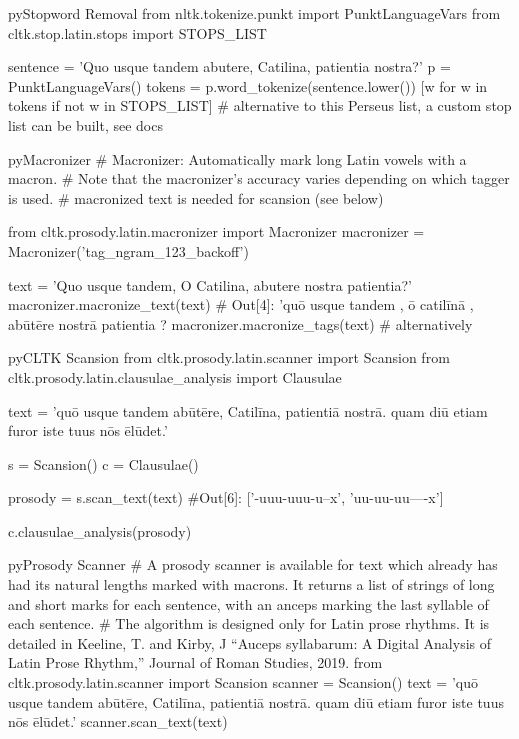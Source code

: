 \documentclass[10pt,a4paper]{article}
\begin{document}
\begin{multicols}{3}
\begin{codebox}{py}{Stopword Removal}
from nltk.tokenize.punkt import PunktLanguageVars
from cltk.stop.latin.stops import STOPS_LIST

sentence = 'Quo usque tandem abutere, Catilina, patientia nostra?'
p = PunktLanguageVars()
tokens = p.word_tokenize(sentence.lower())
[w for w in tokens if not w in STOPS_LIST]
# alternative to this Perseus list, a custom stop list can be built, see docs
\end{codebox}

\begin{codebox}{py}{Macronizer}
# Macronizer: Automatically mark long Latin vowels with a macron. 
# Note that the macronizer’s accuracy varies depending on which tagger is used.
# macronized text is needed for scansion (see below)

from cltk.prosody.latin.macronizer import Macronizer
macronizer = Macronizer('tag_ngram_123_backoff')

text = 'Quo usque tandem, O Catilina, abutere nostra patientia?'
macronizer.macronize_text(text)
# Out[4]: 'quō usque tandem , ō catilīnā , abūtēre nostrā patientia ?
macronizer.macronize_tags(text) # alternatively
\end{codebox}

\begin{codebox}{py}{CLTK Scansion}
from cltk.prosody.latin.scanner import Scansion
from cltk.prosody.latin.clausulae_analysis import Clausulae

text = 'quō usque tandem abūtēre, Catilīna, patientiā nostrā. quam diū etiam furor iste tuus nōs ēlūdet.'

s = Scansion()
c = Clausulae()

prosody = s.scan_text(text) #Out[6]: ['-uuu-uuu-u--x', 'uu-uu-uu----x']

c.clausulae_analysis(prosody)
\end{codebox}

\begin{codebox}{py}{Prosody Scanner}
# A prosody scanner is available for text which already has had its natural lengths marked with macrons. It returns a list of strings of long and short marks for each sentence, with an anceps marking the last syllable of each sentence.
# The algorithm is designed only for Latin prose rhythms. It is detailed in Keeline, T. and Kirby, J “Auceps syllabarum: A Digital Analysis of Latin Prose Rhythm,” Journal of Roman Studies, 2019.
from cltk.prosody.latin.scanner import Scansion
scanner = Scansion()
text = 'quō usque tandem abūtēre, Catilīna, patientiā nostrā. quam diū etiam furor iste tuus nōs ēlūdet.'
scanner.scan_text(text)
\end{codebox}


\end{multicols}
\end{document}
